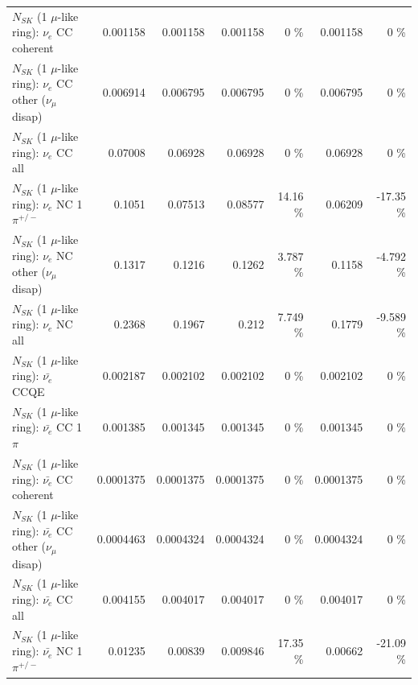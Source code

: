 \begin{table}
\begin{tabular}{| l | r | r | r  r | r  r |}
                               $N_{SK}$ (1 $\mu$-like ring): $\nu_e$ CC coherent &        0.001158 &        0.001158 &        0.001158 &        0 \%  &        0.001158 &        0 \%  \\ 
                $N_{SK}$ (1 $\mu$-like ring): $\nu_e$ CC other ($\nu_\mu$ disap) &        0.006914 &        0.006795 &        0.006795 &        0 \%  &        0.006795 &        0 \%  \\ 
                                  $N_{SK}$ (1 $\mu$-like ring): $\nu_{e}$ CC all &         0.07008 &         0.06928 &         0.06928 &        0 \%  &         0.06928 &        0 \%  \\ 
\hline
                           $N_{SK}$ (1 $\mu$-like ring): $\nu_e$ NC 1$\pi^{+/-}$ &          0.1051 &         0.07513 &         0.08577 &    14.16 \%  &         0.06209 &   -17.35 \%  \\ 
                $N_{SK}$ (1 $\mu$-like ring): $\nu_e$ NC other ($\nu_\mu$ disap) &          0.1317 &          0.1216 &          0.1262 &    3.787 \%  &          0.1158 &   -4.792 \%  \\ 
                                  $N_{SK}$ (1 $\mu$-like ring): $\nu_{e}$ NC all &          0.2368 &          0.1967 &           0.212 &    7.749 \%  &          0.1779 &   -9.589 \%  \\ 
\hline
\hline
\hline
                                $N_{SK}$ (1 $\mu$-like ring): $\bar{\nu_e}$ CCQE &        0.002187 &        0.002102 &        0.002102 &        0 \%  &        0.002102 &        0 \%  \\ 
                           $N_{SK}$ (1 $\mu$-like ring): $\bar{\nu_e}$ CC 1$\pi$ &        0.001385 &        0.001345 &        0.001345 &        0 \%  &        0.001345 &        0 \%  \\ 
                         $N_{SK}$ (1 $\mu$-like ring): $\bar{\nu_e}$ CC coherent &       0.0001375 &       0.0001375 &       0.0001375 &        0 \%  &       0.0001375 &        0 \%  \\ 
          $N_{SK}$ (1 $\mu$-like ring): $\bar{\nu_e}$ CC other ($\nu_\mu$ disap) &       0.0004463 &       0.0004324 &       0.0004324 &        0 \%  &       0.0004324 &        0 \%  \\ 
                            $N_{SK}$ (1 $\mu$-like ring): $\bar{\nu_{e}}$ CC all &        0.004155 &        0.004017 &        0.004017 &        0 \%  &        0.004017 &        0 \%  \\ 
\hline
                     $N_{SK}$ (1 $\mu$-like ring): $\bar{\nu_e}$ NC 1$\pi^{+/-}$ &         0.01235 &         0.00839 &        0.009846 &    17.35 \%  &         0.00662 &   -21.09 \%  \\ 

\end{tabular}
\end{table}
